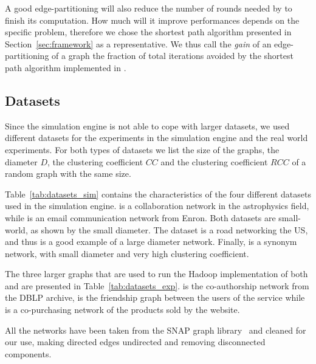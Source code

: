  A good edge-partitioning will also reduce the number
of rounds needed by \etsch to finish its computation. How much will it improve
\etsch performances depends on the specific problem, therefore we chose the
shortest path algorithm presented in Section~\ref{sec:framework} as a
representative. We thus call the \emph{gain} of an edge-partitioning of a graph
the fraction of total iterations avoided by the shortest path algorithm implemented
in \etsch.

\subsection{Datasets}

Since the simulation engine is not able to cope with larger datasets, we used
different datasets for the experiments in the simulation engine and  the
real world experiments. For both types of datasets we list the size of the
graphs, the diameter $D$, the clustering coefficient $CC$ and the
clustering coefficient $RCC$ of a random graph with the same size.

Table~\ref{tab:datasets_sim} contains the characteristics of the four different
datasets used in the simulation engine.  is a collaboration
network in the astrophysics field, while  is an email
communication network from Enron. Both datasets are small-world, as shown by
the small diameter. The  dataset is a road networking the US, and
thus is a good example of a large diameter network. Finally,  is
a synonym network, with small diameter and very high clustering coefficient.

The three larger graphs that are used to run the Hadoop implementation of both
\dfep and \etsch are presented in Table~\ref{tab:datasets_exp}.  is
the co-authorship network from the DBLP archive,  is the
friendship graph between the users of the service while  is a
co-purchasing network of the products sold by the website.

All the networks have been taken from the SNAP graph library~\cite{Leskovec11}
and cleaned for our use, making directed edges undirected and removing
disconnected components.

